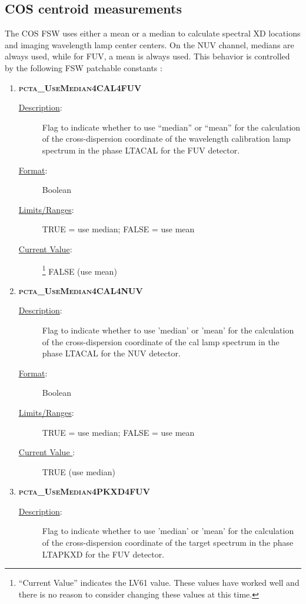 \subsection{COS centroid measurements}
	The COS FSW uses either a mean or a median to calculate spectral XD locations and imaging wavelength lamp center centers.
On the NUV channel, medians are always used, while for FUV, a mean is always used. This
behavior is controlled by the following FSW patchable constants :\\
\footnotesize
\begin{enumerate}
	\setlength{\parskip}{-1pt}
	\setlength{\parsep}{0pt}
	\setlength\itemsep{0.1em}
\item{\textsc{\bf pcta\_UseMedian4CAL4FUV}}
	\begin{description}
	\item[\underline{\rm Description}:]Flag to indicate whether to use ``median'' or ``mean'' for the calculation of the cross-dispersion coordinate of the wavelength calibration lamp spectrum in the phase \textsc{LTACAL} for the FUV detector.
	\item[\underline{\rm Format}:]    Boolean
	\item[\underline{\rm Limits/Ranges}:]  TRUE = use median;  FALSE = use mean
	\item[\underline{\rm Current Value}:]\footnote{``Current Value'' indicates the LV61 value. These values have worked well and there is no reason to consider changing these values at this time.}  FALSE (use mean)
\end{description}
\item{\textsc{\bf pcta\_UseMedian4CAL4NUV}}
	\begin{description}
	\item[\underline{\rm Description}:]Flag to indicate whether to use 'median' or 'mean' for the calculation of the cross-dispersion coordinate of the cal lamp spectrum in the phase \textsc{LTACAL} for the NUV detector.
	\item[\underline{\rm Format}:]    Boolean
	\item[\underline{\rm Limits/Ranges}:]  TRUE = use median;  FALSE = use mean
	\item[\underline{\rm Current Value }:]   TRUE (use median)
\end{description}
\item{\textsc{\bf pcta\_UseMedian4PKXD4FUV}}
	\begin{description}
	\item[\underline{\rm Description}:]Flag to indicate whether to use 'median' or 'mean' for the calculation of the cross-dispersion coordinate of the target spectrum in the phase \textsc{LTAPKXD} for the FUV detector.

\end{description}
\end{enumerate}
